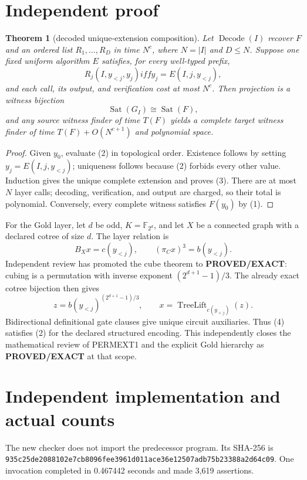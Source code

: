 \documentclass[11pt]{article}
\newtheorem{theorem}{Theorem}
\newcommand{\EXACT}{\textbf{PROVED/EXACT}}
\begin{document}
\section{Independent proof}
\begin{theorem}[decoded unique-extension composition]
Let $\operatorname{Decode}(I)$ recover $F$ and an ordered list
$R_1,\ldots,R_D$ in time $N^c$, where $N=|I|$ and $D\le N$.  Suppose one
fixed uniform algorithm $E$ satisfies, for every well-typed prefix,
\[
R_j(I,y_{<j},y_j)iff y_j=E(I,j,y_{<j}),                 \tag{2}
\]
and each call, its output, and verification cost at most $N^c$.  Then
projection is a witness bijection
\[
\operatorname{Sat}(G_I)\cong\operatorname{Sat}(F),      \tag{3}
\]
and any source witness finder of time $T(F)$ yields a complete target witness
finder of time $T(F)+O(N^{c+1})$ and polynomial space.
\end{theorem}
\begin{proof}
Given $y_0$, evaluate (2) in topological order.  Existence follows by setting
$y_j=E(I,j,y_{<j})$; uniqueness follows because (2) forbids every other
value.  Induction gives the unique complete extension and proves (3).
There are at most $N$ layer calls; decoding, verification, and output are
charged, so their total is polynomial.  Conversely, every complete witness
satisfies $F(y_0)$ by (1).
\end{proof}

For the Gold layer, let $d$ be odd, $K=\mathbb F_{2^d}$, and let $X$ be a
connected graph with a declared cotree of size $d$.  The layer relation is
\[
B_Xx=c(y_{<j}),\qquad (\pi_Cx)^3=b(y_{<j}).              \tag{4}
\]
Independent review has promoted the cube theorem to \EXACT{}: cubing is a
permutation with inverse exponent $(2^{d+1}-1)/3$.  The already exact cotree
bijection then gives
\[
z=b(y_{<j})^{(2^{d+1}-1)/3},\qquad
x=\operatorname{TreeLift}_{c(y_{<j})}(z).               \tag{5}
\]
Bidirectional definitional gate clauses give unique circuit auxiliaries.
Thus (4) satisfies (2) for the declared structured encoding.  This
independently closes the mathematical review of PERMEXT1 and the explicit
Gold hierarchy as \EXACT{} at that scope.

\section{Independent implementation and actual counts}
The new checker
 does not
import the predecessor program.  Its SHA-256 is
\nolinkurl{935c25de2088102e7cb8096fee3961d011ace36e12507adb75b23388a2d64c09}.
One invocation completed in 0.467442 seconds and made 3,619 assertions.
\end{document}
